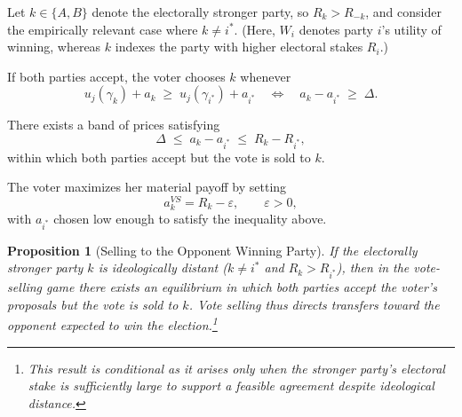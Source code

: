 \documentclass[11pt]{article}
\newtheorem{proposition}{Proposition}
\begin{document}
Let $k \in \{A,B\}$ denote the electorally stronger party, so $R_k > R_{-k}$, and consider the empirically relevant case where $k \neq i^\ast$. (Here, $W_i$ denotes party $i$'s utility of winning, whereas $k$ indexes the party with higher electoral stakes $R_i$.)

If both parties accept, the voter chooses $k$ whenever
\begin{equation}
u_j(\gamma_k) + a_k \;\ge\; u_j(\gamma_{i^\ast}) + a_{i^\ast}
\quad\Longleftrightarrow\quad
a_k - a_{i^\ast} \;\ge\; \Delta.
\end{equation}

There exists a band of prices satisfying
\begin{equation}
\Delta \;\le\; a_k - a_{i^\ast} \;\le\; R_k - R_{i^\ast},
\end{equation}
within which both parties accept but the vote is sold to $k$.

The voter maximizes her material payoff by setting
\begin{equation}
a_k^{VS} = R_k - \varepsilon, \qquad \varepsilon > 0,
\end{equation}
with $a_{i^\ast}$ chosen low enough to satisfy the inequality above.

\begin{proposition}[Selling to the Opponent Winning Party]\label{prop:selling_strong}
If the electorally stronger party $k$ is ideologically distant ($k \neq i^\ast$ and $R_k > R_{i^\ast}$), then in the vote-selling game there exists an equilibrium in which both parties accept the voter's proposals but the vote is sold to $k$. Vote selling thus directs transfers toward the opponent expected to win the election.\footnote{This result is conditional as it arises only when the stronger party's electoral stake is sufficiently large to support a feasible agreement despite ideological distance.}
\end{proposition}
\end{document}

